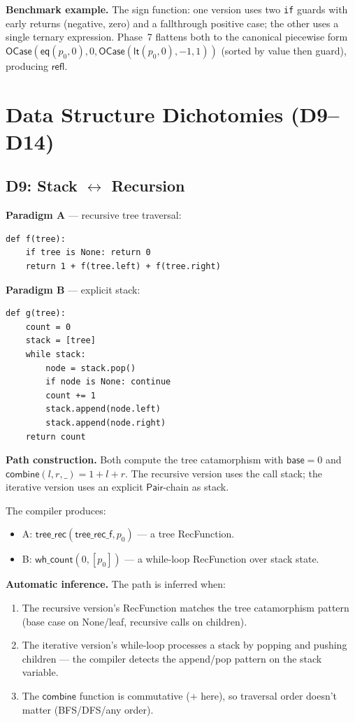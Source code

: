 \documentclass[11pt,a4paper]{report}
\theoremstyle{definition}
\theoremstyle{plain}
\begin{document}
\textbf{Benchmark example.}
The sign function: one version uses two \texttt{if} guards with
early returns (negative, zero) and a fallthrough positive case;
the other uses a single ternary expression.  Phase~7 flattens both
to the canonical piecewise form
$\mathsf{OCase}(\mathsf{eq}(p_0, 0), 0,
\mathsf{OCase}(\mathsf{lt}(p_0, 0), -1, 1))$
(sorted by value then guard), producing $\mathsf{refl}$.


\chapter{Data Structure Dichotomies (D9--D14)}
\label{ch:ds-dichotomies}

\section{D9: Stack $\leftrightarrow$ Recursion}

\textbf{Paradigm A} --- recursive tree traversal:
\begin{lstlisting}
def f(tree):
    if tree is None: return 0
    return 1 + f(tree.left) + f(tree.right)
\end{lstlisting}

\textbf{Paradigm B} --- explicit stack:
\begin{lstlisting}
def g(tree):
    count = 0
    stack = [tree]
    while stack:
        node = stack.pop()
        if node is None: continue
        count += 1
        stack.append(node.left)
        stack.append(node.right)
    return count
\end{lstlisting}

\textbf{Path construction.}
Both compute the tree catamorphism with $\mathsf{base} = 0$ and
$\mathsf{combine}(l, r, \_) = 1 + l + r$.  The recursive version
uses the call stack; the iterative version uses an explicit
$\mathsf{Pair}$-chain as stack.

The compiler produces:
\begin{itemize}
  \item A: $\mathsf{tree\_rec}(\mathsf{tree\_rec\_f}, p_0)$ ---
    a tree RecFunction.
  \item B: $\mathsf{wh\_count}(0, [p_0])$ --- a while-loop RecFunction
    over stack state.
\end{itemize}

\textbf{Automatic inference.}
The path is inferred when:
\begin{enumerate}
  \item The recursive version's RecFunction matches the tree
    catamorphism pattern (base case on None/leaf, recursive calls
    on children).
  \item The iterative version's while-loop processes a stack by
    popping and pushing children --- the compiler detects the
    append/pop pattern on the stack variable.
  \item The $\mathsf{combine}$ function is commutative ($+$ here),
    so traversal order doesn't matter (BFS/DFS/any order).
\end{enumerate}
\end{document}
